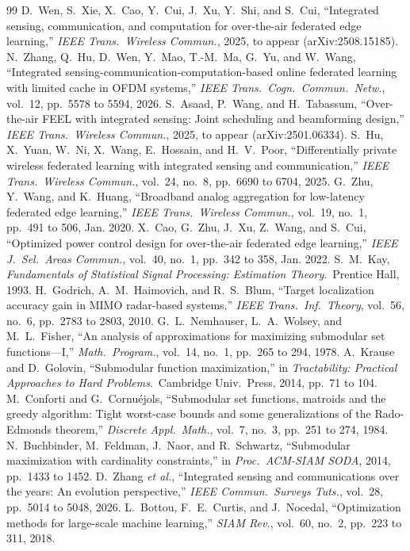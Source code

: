 \documentclass[lettersize,journal]{IEEEtran}
\begin{document}
\begin{thebibliography}{99}
 D.~Wen, S.~Xie, X.~Cao, Y.~Cui, J.~Xu, Y.~Shi, and S.~Cui, ``Integrated sensing, communication, and computation for over-the-air federated edge learning,'' \emph{IEEE Trans.\ Wireless Commun.}, 2025, to appear (arXiv:2508.15185).
 N.~Zhang, Q.~Hu, D.~Wen, Y.~Mao, T.-M.~Ma, G.~Yu, and W.~Wang, ``Integrated sensing-communication-computation-based online federated learning with limited cache in OFDM systems,'' \emph{IEEE Trans.\ Cogn.\ Commun.\ Netw.}, vol.~12, pp.~5578 to 5594, 2026.
 S.~Asaad, P.~Wang, and H.~Tabassum, ``Over-the-air FEEL with integrated sensing: Joint scheduling and beamforming design,'' \emph{IEEE Trans.\ Wireless Commun.}, 2025, to appear (arXiv:2501.06334).
 S.~Hu, X.~Yuan, W.~Ni, X.~Wang, E.~Hossain, and H.~V.~Poor, ``Differentially private wireless federated learning with integrated sensing and communication,'' \emph{IEEE Trans.\ Wireless Commun.}, vol.~24, no.~8, pp.~6690 to 6704, 2025.
 G.~Zhu, Y.~Wang, and K.~Huang, ``Broadband analog aggregation for low-latency federated edge learning,'' \emph{IEEE Trans.\ Wireless Commun.}, vol.~19, no.~1, pp.~491 to 506, Jan. 2020.
 X.~Cao, G.~Zhu, J.~Xu, Z.~Wang, and S.~Cui, ``Optimized power control design for over-the-air federated edge learning,'' \emph{IEEE J.\ Sel.\ Areas Commun.}, vol.~40, no.~1, pp.~342 to 358, Jan. 2022.
 S.~M.~Kay, \emph{Fundamentals of Statistical Signal Processing: Estimation Theory}.\ Prentice Hall, 1993.
 H.~Godrich, A.~M.~Haimovich, and R.~S.~Blum, ``Target localization accuracy gain in MIMO radar-based systems,'' \emph{IEEE Trans.\ Inf.\ Theory}, vol.~56, no.~6, pp.~2783 to 2803, 2010.
 G.~L.~Nemhauser, L.~A.~Wolsey, and M.~L.~Fisher, ``An analysis of approximations for maximizing submodular set functions---I,'' \emph{Math.\ Program.}, vol.~14, no.~1, pp.~265 to 294, 1978.
 A.~Krause and D.~Golovin, ``Submodular function maximization,'' in \emph{Tractability: Practical Approaches to Hard Problems}.\ Cambridge Univ.\ Press, 2014, pp.~71 to 104.
 M.~Conforti and G.~Cornu\'ejols, ``Submodular set functions, matroids and the greedy algorithm: Tight worst-case bounds and some generalizations of the Rado-Edmonds theorem,'' \emph{Discrete Appl.\ Math.}, vol.~7, no.~3, pp.~251 to 274, 1984.
 N.~Buchbinder, M.~Feldman, J.~Naor, and R.~Schwartz, ``Submodular maximization with cardinality constraints,'' in \emph{Proc.\ ACM-SIAM SODA}, 2014, pp.~1433 to 1452.
 D.~Zhang \emph{et al.}, ``Integrated sensing and communications over the years: An evolution perspective,'' \emph{IEEE Commun.\ Surveys Tuts.}, vol.~28, pp.~5014 to 5048, 2026.
 L.~Bottou, F.~E.~Curtis, and J.~Nocedal, ``Optimization methods for large-scale machine learning,'' \emph{SIAM Rev.}, vol.~60, no.~2, pp.~223 to 311, 2018.
\end{thebibliography}
\end{document}
